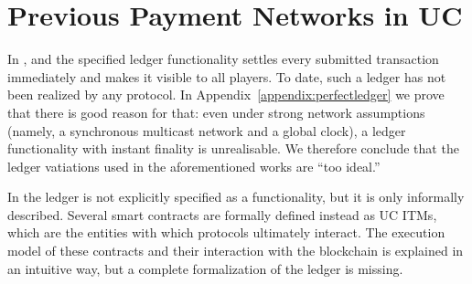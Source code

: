 \section{Previous Payment Networks in UC}
\label{appendix:relwork}
  In \cite{DBLP:conf/ccs/DziembowskiFH18}, \cite{perun} and
  \cite{Malavolta:2017:CPP:3133956.3134096} the specified ledger functionality
  settles every submitted transaction immediately and makes it visible to all
  players. To date, such a ledger has not been realized by any protocol. In
  Appendix~\ref{appendix:perfectledger} we prove that there is good reason for
  that: even under strong network assumptions (namely, a synchronous multicast
  network and a global clock), a ledger functionality with instant finality is
  unrealisable. We therefore conclude that the ledger vatiations used in the
  aforementioned works are ``too ideal.''

  In \cite{sprites} the ledger is not explicitly specified as a functionality,
  but it is only informally described. Several smart contracts are formally
  defined instead as UC ITMs, which are the entities with which protocols
  ultimately interact. The execution model of these contracts and their
  interaction with the blockchain is explained in an intuitive way, but a
  complete formalization of the ledger is missing.
